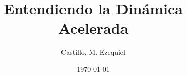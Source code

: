 
\title{Entendiendo la Dinámica Acelerada}
\date{\today}
\author{Castillo, M. Ezequiel}

\maketitle
